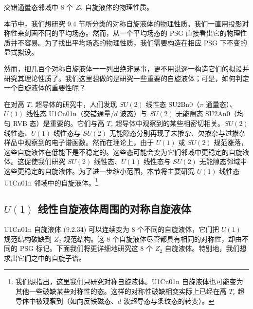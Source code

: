 \begin{keypoints}
\item 交错通量态邻域中 8 个 $Z_{2}$ 自旋液体的物理性质。
\end{keypoints}

本节中，我们想研究 9.4 节所分类的对称自旋液体的物理性质。我们一直用投影对称性来刻画不同的平均场态。然而，从一个平均场态的 PSG 直接看出它的物理性质并不容易。为了找出平均场态的物理性质，我们需要构造在相应 PSG 下不变的显式拟设。

然而，把几百个对称自旋液体一一列出绝非易事，更不用说逐一构造它们的拟设并研究其理论性质了。我们这里想做的是研究一些重要的自旋液体；可是，如何判定一个自旋液体的重要性呢？

在对高 $T_{c}$ 超导体的研究中，人们发现 $SU(2)$ 线性态 SU2Bn0（$\pi$ 通量态）、$U(1)$ 线性态 U1Cn01n（交错通量/$d$ 波态）与 $SU(2)$ 无能隙态 SU2An0（均匀 RVB 态）是重要的。它们与高 $T_{c}$ 超导体中观察到的某些相密切相关。$SU(2)$ 线性态、$U(1)$ 线性态与 $SU(2)$ 无能隙态分别再现了未掺杂、欠掺杂与过掺杂样品中观察到的电子谱函数。然而在理论上，由于 $U(1)$ 或 $SU(2)$ 规范涨落，这些自旋液体在低能下是不稳定的。这些态可能会变为它们邻域中更稳定的自旋液体。这促使我们研究 $SU(2)$ 线性态、$U(1)$ 线性态与 $SU(2)$ 无能隙态邻域中这些更稳定的自旋液体。为了进一步缩小范围，本节将主要研究 $U(1)$ 线性态 U1Cn01n 邻域中的自旋液体。\footnote{我们想指出，这里我们只研究对称自旋液体。U1Cn01n 自旋液体也可能变为其他一些破缺某些对称性的态。这样的对称性破缺相变实际上已经在高 $T_{c}$ 超导体中被观察到（如向反铁磁态、$d$ 波超导态与条纹态的转变）。}

\subsection{$U(1)$ 线性自旋液体周围的对称自旋液体}

U1Cn01n 自旋液体 (9.2.34) 可以连续变为 8 个不同的自旋液体，它们把 $U(1)$ 规范结构破缺到 $Z_{2}$ 规范结构。这 8 个自旋液体尽管都具有相同的对称性，却由不同的 PSG 标记。下面我们将更详细地研究这 8 个 $Z_{2}$ 自旋液体。特别地，我们想求出它们之中的自旋子谱。

